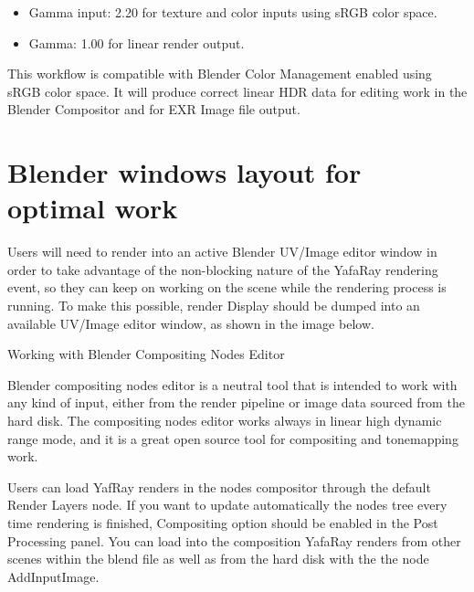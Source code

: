 \begin{itemize}
\item Gamma input: 2.20 for texture and color inputs using sRGB color space.
\item Gamma: 1.00 for linear render output.
\end{itemize}

This workflow is compatible with Blender Color Management enabled using sRGB color space. It will produce correct linear HDR data for editing work in the Blender Compositor and for EXR Image file output.

\section{Blender windows layout for optimal work}

Users will need to render into an active Blender UV/Image editor window in order to take advantage of the non-blocking nature of the YafaRay rendering event, so they can keep on working on the scene while the rendering process is running. To make this possible, render Display should be dumped into an available UV/Image editor window, as shown in the image below.

Working with Blender Compositing Nodes Editor

Blender compositing nodes editor is a neutral tool that is intended to work with any kind of input, either from the render pipeline or image data sourced from the hard disk. The compositing nodes editor works always in linear high dynamic range mode, and it is a great open source tool for compositing and tonemapping work.

Users can load YafRay renders in the nodes compositor through the default Render Layers node. If you want to update automatically the nodes tree every time rendering is finished, Compositing option should be enabled in the Post Processing panel. You can load into the composition YafaRay renders from other scenes within the blend file as well as from the hard disk with the the node Add\textrightarrow{}Input\textrightarrow{}Image.

